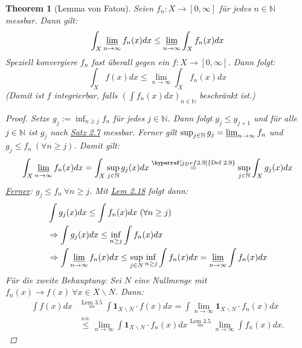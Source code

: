 \documentclass[a4paper]{report}
\newcommand{\doubleOne}{\textbf{1}}
\newcommand{\N}{\mathbb{N}}
\newcommand{\toInf}{\rightarrow \infty}
\newcommand{\limToInf}[1]{\lim_{#1 \toInf}}
\newcommand{\jlabel}[1]{\label{j_#1}}
\newcommand{\jshortlink}[1]{\jhyperref{#1}{\text{#1}}}
\newcommand{\jhyperref}[2]{\hyperref[j_#1]{#2}}
\newcommand{\jlink}[1]{\jhyperref{#1}{#1}}
\newcommand{\jabb}[3]{ #1: #2 \rightarrow #3 }
\theoremstyle{plain}
\newtheorem{thm}{Theorem}[chapter]
\theoremstyle{definition}
\begin{document}
{{{{\begin{thm}[Lemma von Fatou]
\jlabel{Thm 3.9}
\jlabel{Fatou}
    Seien $\jabb{f_n}{X}{[0,\infty]}$ für jedes $n\in\N$ messbar. Dann gilt:
    \begin{displaymath}
        \int_X \varliminf_{n\rightarrow \infty} f_n(x) dx \le \varliminf_{n\rightarrow\infty} \int_X f_n(x) dx
    \end{displaymath}
    Speziell konvergiere $f_n$ fast überall gegen ein $\jabb{f}{X}{[0,\infty]}$. Dann folgt:
    \begin{displaymath}
        \int_X f(x) dx \le \lim_{n\rightarrow \infty} \int_X f_n(x) dx
    \end{displaymath}
    (Damit ist $f$ integrierbar, falls $\left (\int f_n(x) dx \right)_{n\in\N}$ beschränkt ist.)
    \begin{proof}
        Setze $g_j := \inf_{n\ge j} f_n$ für jedes $j\in\N$. Dann folgt $g_j \le g_{j+1}$ und für alle $j\in\N$ ist $g_j$ nach \jlink{Satz 2.7} messbar. Ferner gilt $\sup_{j\in\N} g_j = \varliminf_{n\rightarrow \infty} f_n$ und $g_j \le f_n \ (\forall n \ge j)$. Damit gilt:
        \begin{displaymath}
            \int_X \varliminf_{n\rightarrow \infty} f_n(x)dx = \int_X \sup_{j\in\N} g_j(x)dx \overset{\jshortlink{Def 2.9}}{=} \sup_{j\in \N} \int_X g_j(x)dx
        \end{displaymath}
        \uline{Ferner}: $g_j \le f_n \ \forall n\ge j$. Mit \jlink{Lem 2.18} folgt dann:
        \begin{displaymath}
            \begin{split}
                &\int g_j(x) dx \le \int f_n(x) dx \ (\forall n\ge j) \\
                &\Rightarrow \int g_j(x) dx \le \inf_{n\ge j} \int f_n(x) dx \\
                &\Rightarrow \int \varliminf_{n\rightarrow \infty} f_n(x) dx \le \sup_{j\in N} \inf_{n\ge j} \int f_n(x) dx = \varliminf_{n\rightarrow \infty} \int f_n(x) dx
            \end{split}
        \end{displaymath}
        Für die zweite Behauptung: Sei $N$ eine Nullmenge mit $f_n(x) \rightarrow f(x) \ \forall x\in X\backslash N$. Dann:
        \begin{displaymath}
            \begin{split}
                \int f(x) dx &\overset{\jshortlink{Lem 3.5}}{=} \int \doubleOne_{X\backslash N} \cdot f(x) dx = \int \lim_{n\rightarrow \infty} \doubleOne_{X\backslash N} \cdot f_n(x) dx \\
                &\overset{\text{s.o.}}{\le} \limToInf{n} \int \doubleOne_{X\backslash N} \cdot f_n(x) dx \overset{\jshortlink{Lem 3.5}}{=} \limToInf{n} \int f_n(x) dx.
            \end{split}
        \end{displaymath}
    \end{proof}
\end{thm}

}}}}
\end{document}
